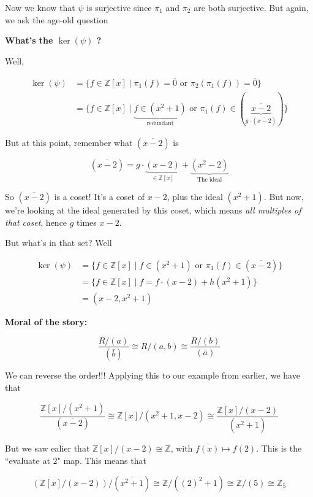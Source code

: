 \documentclass[12pt]{article}
\def\Z{{\mathbb Z}}
\theoremstyle{remark}
\theoremstyle{remark}
\theoremstyle{remark}
\theoremstyle{remark}
\theoremstyle{remark}
\begin{document}
Now we know that $\psi$ is surjective since $\pi_1$ and $\pi_2$ are both
surjective. But again, we ask the age-old question

{\bf What's the $\ker(\psi)$ ?}

Well,

\begin{align*}
  \ker(\psi) &= \{f \in \Z[x] \mid \pi_1 (f) = \bar 0 \text{ or } \pi_2(\pi_1(f)) = \bar 0 \} \\
             &= \{f \in \Z[x] \mid \underbrace{f \in (x^2 + 1)}_{\text{redundant}} \text{ or } \pi_1(f) \in (\underbrace{\overline{x - 2}}_{\bar g \cdot (\overline{x - 2})})\}
\end{align*}

But at this point, remember what $(\overline{x - 2})$ is

\[
  (\overline{x - 2}) = g \cdot \underbrace{(x - 2)}_{\in \Z[x]} + \underbrace{(x^2 - 2)}_{\text{The ideal}}
\]

So $(\overline{x - 2})$ is a coset! It's a coset of $x - 2$, plus the ideal
$(x^2 + 1)$. But now, we're looking at the ideal generated by this coset, which
means {\it all multiples of that coset}, hence $g$ times $x - 2$.

But what's in that set? Well

\begin{align*}
  \ker(\psi) &= \{f \in \Z[x] \mid f \in (x^2 + 1) \text{ or } \pi_1(f) \in (\overline{x - 2})\} \\
             &= \{f \in \Z[x] \mid f = f \cdot (x - 2) + h (x^2 + 1) \} \\
             &= (x - 2, x^2 + 1)
\end{align*}

{\bf Moral of the story:}

\[
  \frac{R / (a)}{(\bar b)} \cong R / (a, b) \cong \frac{R / (b)}{(\bar a)}
\]

We can reverse the order!!! Applying this to our example from earlier, we have
that 

\[
  \frac{\Z[x] / (x^2 + 1)}{(\overline{x - 2})} \cong \Z[x] / (x^2 + 1, x - 2)
  \cong \frac{\Z[x] / (x - 2)}{(\overline{x^2 + 1})}
\]

But we saw ealier that $\Z[x] / (x - 2) \cong \Z$, with $\overline{f(x)} \mapsto
f(2)$. This is the ``evaluate at $2$" map. This means that

\[
  (\Z[x] / (x - 2)) / (\overline{x^2 + 1}) \cong \Z / ((2)^2 + 1) \cong \Z / (5)
  \cong \Z_5
\]
\end{document}
